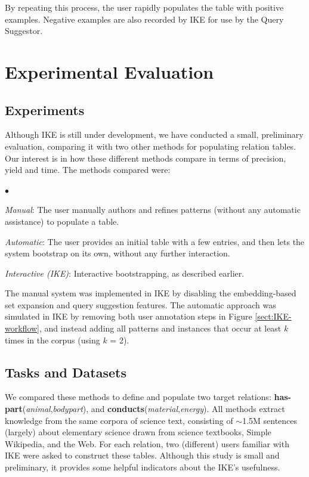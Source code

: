 \documentclass[11pt,letterpaper]{article}
\newcommand{\pred}{\bf}
\newcommand{\squishlist}{
   \begin{list}{$\bullet$}
    { \setlength{\itemsep}{-1pt}      \setlength{\parsep}{3pt}
      \setlength{\topsep}{1pt}       \setlength{\partopsep}{0pt}
      \setlength{\leftmargin}{1.5em} \setlength{\labelwidth}{1em}
      \setlength{\labelsep}{0.5em} } }
\newcommand{\squishend}{
    \end{list}  }
\begin{document}
By repeating this process, the user rapidly populates the table with positive examples. Negative examples are also recorded by IKE for use by the Query Suggestor.

\section{Experimental Evaluation} \label{sect:expt-eval}

\subsection{Experiments}

Although IKE is still under development, we have conducted a small, preliminary evaluation, comparing it with two other methods for populating relation tables. Our interest is in how these different methods compare in terms of precision, yield and time. The methods compared were:
\squishlist
\item \emph{Manual}: The user manually authors and refines patterns (without any automatic assistance) to populate a table.
\item \emph{Automatic}: The user provides an initial table with a few entries, and then lets the system bootstrap on its own, without any further interaction.
\item \emph{Interactive (IKE)}: Interactive bootstrapping, as described earlier.
\squishend
The manual system was implemented in IKE by disabling the embedding-based set expansion and query suggestion features. The automatic approach was simulated in IKE by removing both user annotation steps in Figure \ref{sect:IKE-workflow}, and instead adding all patterns and instances that occur at least $k$ times in the corpus (using $k$ = 2).

\subsection{Tasks and Datasets}

We compared these methods to define and populate two target relations: {\pred has-part}({\it animal},{\it bodypart}), and {\pred conducts}({\it material},{\it energy}).
All methods extract knowledge from the same corpora of science text, consisting of $\sim$1.5M sentences (largely) about elementary science drawn from science textbooks, Simple Wikipedia, and the Web. For each relation, two (different) users familiar with IKE were asked to construct these tables. Although this study is small and preliminary, it provides some helpful indicators about the IKE's usefulness.
\end{document}
